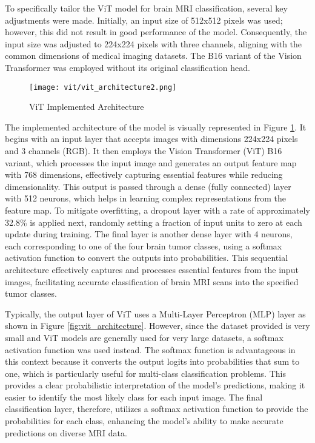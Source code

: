 To specifically tailor the ViT model for brain MRI classification, several key adjustments were made. Initially, an input size of 512x512 pixels was used; however, this did not result in good performance of the model. Consequently, the input size was adjusted to 224x224 pixels with three channels, aligning with the common dimensions of medical imaging datasets. The B16 variant of the Vision Transformer was employed without its original classification head. 

\begin{figure}[H]
  \centering
  \texttt{[image: vit/vit\_architecture2.png]}
  \caption{ViT Implemented Architecture}
  \label{fig:vit_implemented_architecture}
\end{figure}

The implemented architecture of the model is visually represented in Figure \ref{fig:vit_implemented_architecture}. It begins with an input layer that accepts images with dimensions 224x224 pixels and 3 channels (RGB). It then employs the Vision Transformer (ViT) B16 variant, which processes the input image and generates an output feature map with 768 dimensions, effectively capturing essential features while reducing dimensionality. This output is passed through a dense (fully connected) layer with 512 neurons, which helps in learning complex representations from the feature map. To mitigate overfitting, a dropout layer with a rate of approximately 32.8\% is applied next, randomly setting a fraction of input units to zero at each update during training. The final layer is another dense layer with 4 neurons, each corresponding to one of the four brain tumor classes, using a softmax activation function to convert the outputs into probabilities. This sequential architecture effectively captures and processes essential features from the input images, facilitating accurate classification of brain MRI scans into the specified tumor classes.

Typically, the output layer of ViT uses a Multi-Layer Perceptron (MLP) layer as shown in Figure \ref{fig:vit_architecture}. However, since the dataset provided is very small and ViT models are generally used for very large datasets, a softmax activation function was used instead. The softmax function is advantageous in this context because it converts the output logits into probabilities that sum to one, which is particularly useful for multi-class classification problems. This provides a clear probabilistic interpretation of the model's predictions, making it easier to identify the most likely class for each input image. The final classification layer, therefore, utilizes a softmax activation function to provide the probabilities for each class, enhancing the model's ability to make accurate predictions on diverse MRI data.

